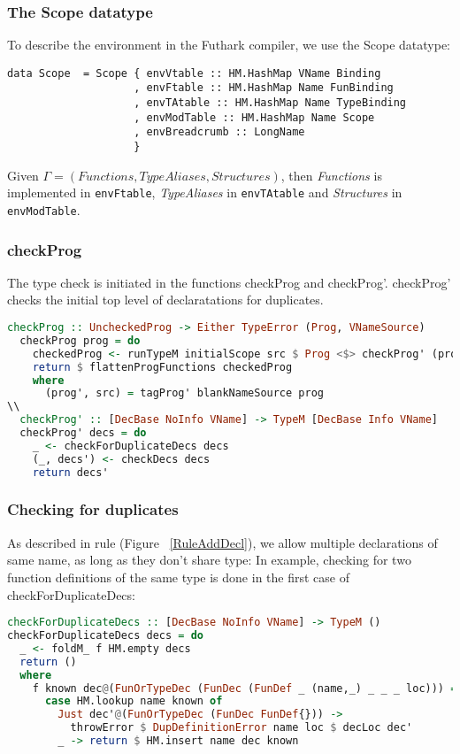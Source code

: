 \subsubsection{The Scope datatype}
To describe the environment in the Futhark compiler, we use the Scope datatype:
\begin{verbatim}
data Scope  = Scope { envVtable :: HM.HashMap VName Binding
                    , envFtable :: HM.HashMap Name FunBinding
                    , envTAtable :: HM.HashMap Name TypeBinding
                    , envModTable :: HM.HashMap Name Scope
                    , envBreadcrumb :: LongName
                    }
\end{verbatim}
Given $\Gamma = (Functions, TypeAliases, Structures)$, then \textit{Functions} is
implemented in \texttt{envFtable}, \textit{TypeAliases} in \texttt{envTAtable} and \textit{Structures} in \texttt{envModTable}.
\subsubsection{checkProg}
The type check is initiated in the functions checkProg and checkProg'.
checkProg' checks the initial top level of declaratations for duplicates.
\begin{lstlisting}[language=Haskell]
  checkProg :: UncheckedProg -> Either TypeError (Prog, VNameSource)
  checkProg prog = do
    checkedProg <- runTypeM initialScope src $ Prog <$> checkProg' (progDecs prog')
    return $ flattenProgFunctions checkedProg
    where
      (prog', src) = tagProg' blankNameSource prog
\\  
  checkProg' :: [DecBase NoInfo VName] -> TypeM [DecBase Info VName]
  checkProg' decs = do
    _ <- checkForDuplicateDecs decs
    (_, decs') <- checkDecs decs
    return decs'
\end{lstlisting}
\subsubsection{Checking for duplicates}
\label{subsec:checkingforduplicates}
As described in rule (Figure ~\ref{RuleAddDecl}), we allow multiple declarations of same name,
as long as they don't share type:
In example, checking for two function definitions of the same type is done in
the first case of checkForDuplicateDecs:
\begin{lstlisting}[language=Haskell]
checkForDuplicateDecs :: [DecBase NoInfo VName] -> TypeM ()
checkForDuplicateDecs decs = do
  _ <- foldM_ f HM.empty decs
  return ()
  where
    f known dec@(FunOrTypeDec (FunDec (FunDef _ (name,_) _ _ _ loc))) =
      case HM.lookup name known of
        Just dec'@(FunOrTypeDec (FunDec FunDef{})) ->
          throwError $ DupDefinitionError name loc $ decLoc dec'
        _ -> return $ HM.insert name dec known
\end{lstlisting}
